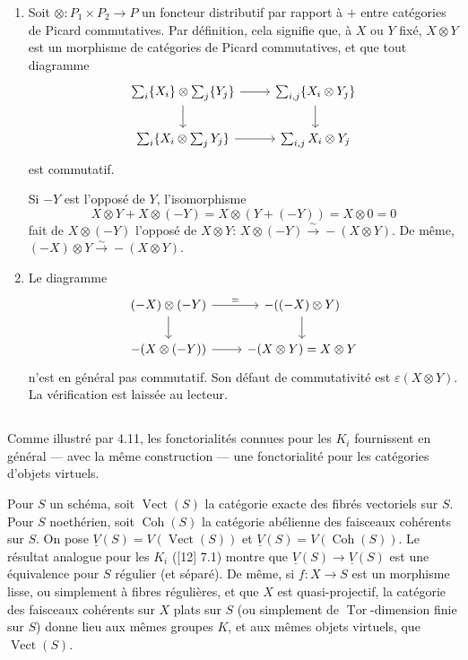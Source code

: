 \documentclass[12pt,a4paper]{article}
\theoremstyle{plain}
\theoremstyle{definition}
\DeclareMathOperator{\Vect}{Vect}
\DeclareMathOperator{\Coh}{Coh}
\DeclareMathOperator{\Tor}{Tor}
\begin{document}
\begin{enumerate}[label=(\alph*)]
\item Soit $\otimes: P_1 \times P_2 \to P$ un foncteur distributif par rapport \`a $+$ entre cat\'egories
de Picard commutatives. Par d\'efinition, cela signifie que, \`a $X$ ou $Y$ fix\'e,
$X \otimes Y$ est un morphisme de cat\'egories de Picard commutatives, et que tout diagramme
\[
\begin{tikzcd}
\sum_i \{X_i\} \otimes \sum_j \{Y_j\} \arrow[r] \arrow[d] & \sum_{i,j} \{X_i \otimes Y_j\} \arrow[d] \\
\sum_i \{X_i \otimes \sum_j Y_j\} \arrow[r] & \sum_{i,j} X_i \otimes Y_j
\end{tikzcd}
\]
est commutatif.

Si $-Y$ est l'oppos\'e de $Y$, l'isomorphisme
\[
X \otimes Y + X \otimes (-Y) = X \otimes (Y + (-Y)) = X \otimes 0 = 0
\]
fait de $X \otimes (-Y)$ l'oppos\'e de $X \otimes Y$: $X \otimes (-Y) \xrightarrow{\sim} -(X \otimes Y)$. De m\^eme, $(-X) \otimes
Y \xrightarrow{\sim} -(X \otimes Y)$.

\item Le diagramme
\[
\begin{tikzcd}
(-X) \otimes (-Y) \arrow[r, "="] \arrow[d] & -((-X) \otimes Y) \arrow[d] \\
-(X \otimes (-Y)) \arrow[r] & -(X \otimes Y) = X \otimes Y
\end{tikzcd}
\]
n'est en g\'en\'eral pas commutatif. Son d\'efaut de commutativit\'e est $\varepsilon(X \otimes Y)$.
La v\'erification est laiss\'ee au lecteur.
\end{enumerate}

\subsection{}

Comme illustr\'e par 4.11, les fonctorialit\'es connues pour les $K_i$ fournissent
en g\'en\'eral --- avec la m\^eme construction --- une fonctorialit\'e pour les cat\'egories d'objets
virtuels.

Pour $S$ un sch\'ema, soit $\Vect(S)$ la cat\'egorie exacte des fibr\'es vectoriels
sur $S$. Pour $S$ noeth\'erien, soit $\Coh(S)$ la cat\'egorie ab\'elienne des faisceaux
coh\'erents sur $S$. On pose $\underline{V}(S) = V(\Vect(S))$ et $\underline{V}(S) = V(\Coh(S))$. Le r\'esultat
analogue pour les $K_i$ ([12] 7.1) montre que $\underline{V}(S) \to \underline{V}(S)$ est une \'equivalence
pour $S$ r\'egulier (et s\'epar\'e). De m\^eme, si $f: X \to S$ est un morphisme lisse,
ou simplement \`a fibres r\'eguli\`eres, et que $X$ est quasi-projectif, la cat\'egorie
des faisceaux coh\'erents sur $X$ plats sur $S$ (ou simplement de $\Tor$-dimension
finie sur $S$) donne lieu aux m\^emes groupes $K$, et aux m\^emes objets virtuels,
que $\Vect(S)$.
\end{document}
